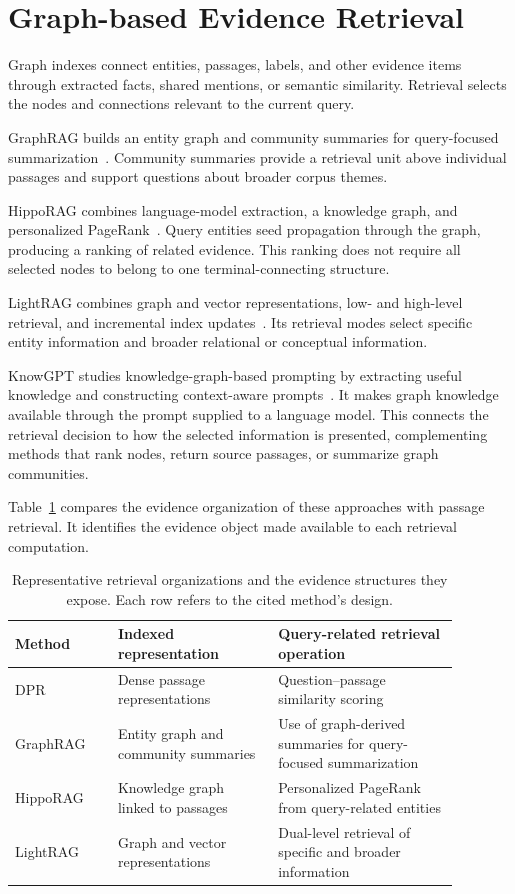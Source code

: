 \section{Graph-based Evidence Retrieval}
\label{sec:background:graph-retrieval}

Graph indexes connect entities, passages, labels, and other evidence items through extracted facts, shared mentions, or semantic similarity. Retrieval selects the nodes and connections relevant to the current query.

GraphRAG builds an entity graph and community summaries for query-focused summarization~\cite{bg-graphrag}. Community summaries provide a retrieval unit above individual passages and support questions about broader corpus themes.

HippoRAG combines language-model extraction, a knowledge graph, and personalized PageRank~\cite{bg-hipporag}. Query entities seed propagation through the graph, producing a ranking of related evidence. This ranking does not require all selected nodes to belong to one terminal-connecting structure.

LightRAG combines graph and vector representations, low- and high-level retrieval, and incremental index updates~\cite{bg-lightrag}. Its retrieval modes select specific entity information and broader relational or conceptual information.

KnowGPT studies knowledge-graph-based prompting by extracting useful knowledge and constructing context-aware prompts~\cite{lit-zhang2024knowgpt}. It makes graph knowledge available through the prompt supplied to a language model. This connects the retrieval decision to how the selected information is presented, complementing methods that rank nodes, return source passages, or summarize graph communities.

Table~\ref{tab:background:retrieval-units} compares the evidence organization of these approaches with passage retrieval. It identifies the evidence object made available to each retrieval computation.

\begin{table}[tbp]
\centering
\caption{Representative retrieval organizations and the evidence structures they expose. Each row refers to the cited method's design.}
\label{tab:background:retrieval-units}
\small
\begin{tabular}{p{0.20\linewidth}p{0.32\linewidth}p{0.36\linewidth}}
\toprule
Method&Indexed representation&Query-related retrieval operation\\
\midrule
DPR~\cite{bg-dpr}&Dense passage representations&Question--passage similarity scoring\\
GraphRAG~\cite{bg-graphrag}&Entity graph and community summaries&Use of graph-derived summaries for query-focused summarization\\
HippoRAG~\cite{bg-hipporag}&Knowledge graph linked to passages&Personalized PageRank from query-related entities\\
LightRAG~\cite{bg-lightrag}&Graph and vector representations&Dual-level retrieval of specific and broader information\\
\bottomrule
\end{tabular}
\end{table}

